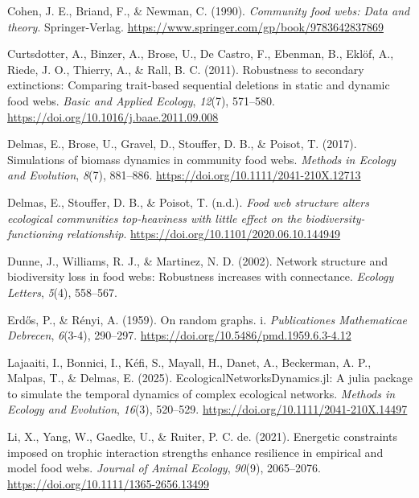 \documentclass[
]{article}
\newlength{\cslhangindent}
\newenvironment{CSLReferences}[2] %
 {\begin{list}{}{%
  \setlength{\itemindent}{0pt}
  \setlength{\leftmargin}{0pt}
  \setlength{\parsep}{0pt}
  \ifodd #1
   \setlength{\leftmargin}{\cslhangindent}
   \setlength{\itemindent}{-1\cslhangindent}
  \fi
  \setlength{\itemsep}{#2\baselineskip}}}
 {\end{list}}
\begin{document}
\begin{CSLReferences}{1}{0}
Cohen, J. E., Briand, F., \& Newman, C. (1990). \emph{Community food
webs: Data and theory}. Springer-Verlag.
\url{https://www.springer.com/gp/book/9783642837869}

Curtsdotter, A., Binzer, A., Brose, U., De Castro, F., Ebenman, B.,
Eklöf, A., Riede, J. O., Thierry, A., \& Rall, B. C. (2011). Robustness
to secondary extinctions: Comparing trait-based sequential deletions in
static and dynamic food webs. \emph{Basic and Applied Ecology},
\emph{12}(7), 571--580. \url{https://doi.org/10.1016/j.baae.2011.09.008}

Delmas, E., Brose, U., Gravel, D., Stouffer, D. B., \& Poisot, T.
(2017). Simulations of biomass dynamics in community food webs.
\emph{Methods in Ecology and Evolution}, \emph{8}(7), 881--886.
\url{https://doi.org/10.1111/2041-210X.12713}

Delmas, E., Stouffer, D. B., \& Poisot, T. (n.d.). \emph{Food web
structure alters ecological communities top-heaviness with little effect
on the biodiversity-functioning relationship}.
\url{https://doi.org/10.1101/2020.06.10.144949}

Dunne, J., Williams, R. J., \& Martinez, N. D. (2002). Network structure
and biodiversity loss in food webs: Robustness increases with
connectance. \emph{Ecology Letters}, \emph{5}(4), 558--567.

Erdős, P., \& Rényi, A. (1959). On random graphs. i. \emph{Publicationes
Mathematicae Debrecen}, \emph{6}(3-4), 290--297.
\url{https://doi.org/10.5486/pmd.1959.6.3-4.12}

Lajaaiti, I., Bonnici, I., Kéfi, S., Mayall, H., Danet, A., Beckerman,
A. P., Malpas, T., \& Delmas, E. (2025). EcologicalNetworksDynamics.jl:
A julia package to simulate the temporal dynamics of complex ecological
networks. \emph{Methods in Ecology and Evolution}, \emph{16}(3),
520--529. \url{https://doi.org/10.1111/2041-210X.14497}

Li, X., Yang, W., Gaedke, U., \& Ruiter, P. C. de. (2021). Energetic
constraints imposed on trophic interaction strengths enhance resilience
in empirical and model food webs. \emph{Journal of Animal Ecology},
\emph{90}(9), 2065--2076. \url{https://doi.org/10.1111/1365-2656.13499}


\end{CSLReferences}
\end{document}
